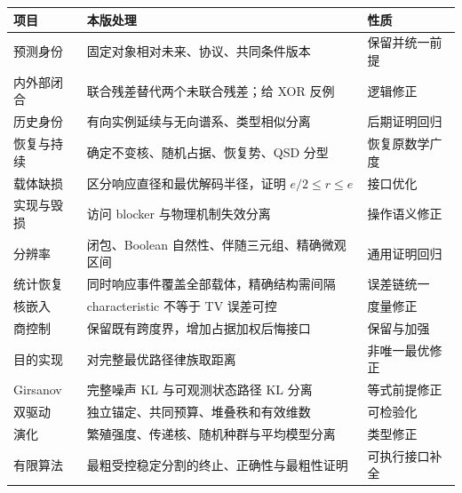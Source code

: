 \documentclass[
  11pt,
  oneside]{book}
\newcounter{none} %
\begin{document}
{\def\LTcaptype{none} %
\begin{longtable}[]{@{}
  >{\raggedright\arraybackslash}p{}
  >{\raggedright\arraybackslash}p{}
  >{\raggedright\arraybackslash}p{}@{}}
\toprule\noalign{}
\begin{minipage}[b]{\linewidth}\raggedright
项目
\end{minipage} & \begin{minipage}[b]{\linewidth}\raggedright
本版处理
\end{minipage} & \begin{minipage}[b]{\linewidth}\raggedright
性质
\end{minipage} \\
\midrule\noalign{}
\endhead
\bottomrule\noalign{}
\endlastfoot
预测身份 & 固定对象相对未来、协议、共同条件版本 & 保留并统一前提 \\
内外部闭合 & 联合残差替代两个未联合残差；给 XOR 反例 & 逻辑修正 \\
历史身份 & 有向实例延续与无向谱系、类型相似分离 & 后期证明回归 \\
恢复与持续 & 确定不变核、随机占据、恢复势、QSD 分型 & 恢复原数学广度 \\
载体缺损 & 区分响应直径和最优解码半径，证明 \(e/2\le r\le e\) & 接口优化 \\
实现与毁损 & 访问 blocker 与物理机制失效分离 & 操作语义修正 \\
分辨率 & 闭包、Boolean 自然性、伴随三元组、精确微观区间 & 通用证明回归 \\
统计恢复 & 同时响应事件覆盖全部载体，精确结构需间隔 & 误差链统一 \\
核嵌入 & characteristic 不等于 TV 误差可控 & 度量修正 \\
商控制 & 保留既有跨度界，增加占据加权后悔接口 & 保留与加强 \\
目的实现 & 对完整最优路径律族取距离 & 非唯一最优修正 \\
Girsanov & 完整噪声 KL 与可观测状态路径 KL 分离 & 等式前提修正 \\
双驱动 & 独立锚定、共同预算、堆叠秩和有效维数 & 可检验化 \\
演化 & 繁殖强度、传递核、随机种群与平均模型分离 & 类型修正 \\
有限算法 & 最粗受控稳定分割的终止、正确性与最粗性证明 & 可执行接口补全 \\
\end{longtable}
}
\end{document}
